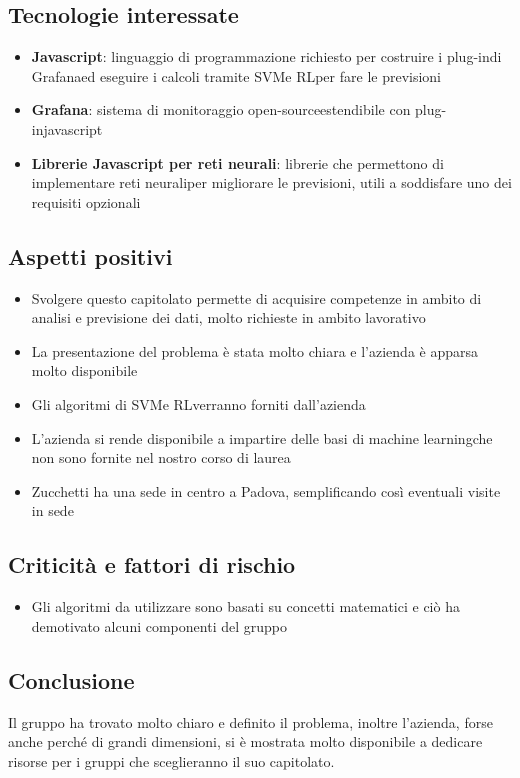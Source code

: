\subsection{Tecnologie interessate}
\begin{itemize}
	\item \textbf{Javascript}: linguaggio di programmazione richiesto per costruire i plug-in\glosp di Grafana\glosp ed eseguire i calcoli tramite SVM\glosp e RL\glosp per fare le previsioni
	\item \textbf{Grafana}: sistema di monitoraggio open-source\glosp estendibile con plug-in\glosp javascript\glo
	\item \textbf{Librerie Javascript per reti neurali}: librerie che permettono di implementare reti neurali\glosp per migliorare le previsioni, utili a soddisfare uno dei requisiti opzionali
\end{itemize}

\subsection{Aspetti positivi}
\begin{itemize}
	\item Svolgere questo capitolato permette di acquisire competenze in ambito di analisi e previsione dei dati, molto richieste in ambito lavorativo
	\item La presentazione del problema è stata molto chiara e l'azienda è apparsa molto disponibile
	\item Gli algoritmi di SVM\glosp e RL\glosp verranno forniti dall'azienda
	\item L'azienda si rende disponibile a impartire delle basi di machine learning\glosp che non sono fornite nel nostro corso di laurea
	\item Zucchetti ha una sede in centro a Padova, semplificando così eventuali visite in sede
\end{itemize}
\subsection{Criticità e fattori di rischio}
\begin{itemize}
	\item Gli algoritmi da utilizzare sono basati su concetti matematici e ciò ha demotivato alcuni componenti del gruppo

\end{itemize}
\subsection{Conclusione}
Il gruppo ha trovato molto chiaro e definito il problema, inoltre l'azienda, forse anche perché di grandi dimensioni, si è mostrata molto disponibile a dedicare risorse per i gruppi che sceglieranno il suo capitolato.
